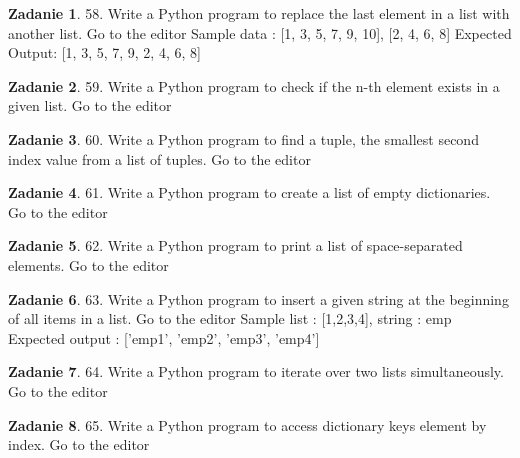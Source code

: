 \documentclass[11pt]{article}
\theoremstyle{definition}
\newtheorem{zadanie}{Zadanie}
\begin{document}
\begin{zadanie}


58. Write a Python program to replace the last element in a list with another list. Go to the editor
Sample data : [1, 3, 5, 7, 9, 10], [2, 4, 6, 8]
Expected Output: [1, 3, 5, 7, 9, 2, 4, 6, 8]


\end{zadanie}

\begin{zadanie}


59. Write a Python program to check if the n-th element exists in a given list. Go to the editor


\end{zadanie}

\begin{zadanie}


60. Write a Python program to find a tuple, the smallest second index value from a list of tuples. Go to the editor


\end{zadanie}

\begin{zadanie}


61. Write a Python program to create a list of empty dictionaries. Go to the editor


\end{zadanie}

\begin{zadanie}


62. Write a Python program to print a list of space-separated elements. Go to the editor


\end{zadanie}

\begin{zadanie}


63. Write a Python program to insert a given string at the beginning of all items in a list. Go to the editor
Sample list : [1,2,3,4], string : emp
Expected output : ['emp1', 'emp2', 'emp3', 'emp4']


\end{zadanie}

\begin{zadanie}


64. Write a Python program to iterate over two lists simultaneously. Go to the editor


\end{zadanie}

\begin{zadanie}


65. Write a Python program to access dictionary keys element by index. Go to the editor


\end{zadanie}
\end{document}
